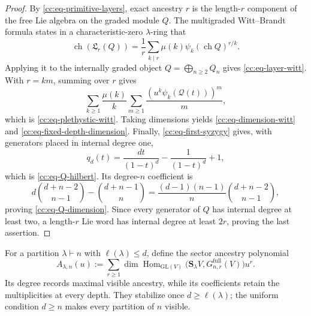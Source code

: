 \documentclass[10pt,reqno]{amsart}
\theoremstyle{plain}
\theoremstyle{definition}
\theoremstyle{remark}
\begin{document}
\begin{proof}
By \eqref{cc:eq-primitive-layers}, exact ancestry \(r\) is the
length-\(r\) component of the free Lie algebra on the graded module \(Q\).
The multigraded Witt--Brandt formula
\cite[\S0.4.2 and \S8.2]{Reutenauer93} states in a characteristic-zero
\(\lambda\)-ring that
\[
 \operatorname{ch}({\mathfrak L}_r(Q))
 =\frac1r\sum_{k\mid r}\mu(k)
   \psi_k(\operatorname{ch}Q)^{r/k}.
\]
Applying it to the internally graded object \(Q=\bigoplus_{n\ge2}Q_n\)
gives \eqref{cc:eq-layer-witt}.  With \(r=km\), summing over \(r\)
gives
\[
 \sum_{k\ge1}\frac{\mu(k)}{k}
 \sum_{m\ge1}\frac{(u^k\psi_k(\mathcal Q(t)))^m}{m},
\]
which is \eqref{cc:eq-plethystic-witt}.  Taking dimensions yields
\eqref{cc:eq-dimension-witt} and
\eqref{cc:eq-fixed-depth-dimension}.  Finally,
\eqref{cc:eq-first-syzygy} gives, with generators placed in internal
degree one,
\[
 q_d(t)=\frac{dt}{(1-t)^d}-\frac1{(1-t)^d}+1,
\]
which is \eqref{cc:eq-Q-hilbert}.  Its degree-\(n\) coefficient is
\[
 d\binom{d+n-2}{n-1}-\binom{d+n-1}{n}
 =\frac{(d-1)(n-1)}{n}\binom{d+n-2}{n-1},
\]
proving \eqref{cc:eq-Q-dimension}.  Since every
generator of \(Q\) has internal degree at least two, a length-\(r\) Lie
word has internal degree at least \(2r\), proving the last assertion.
\end{proof}

For a partition \(\lambda\vdash n\) with \(\ell(\lambda)\leq d\), define
the sector ancestry polynomial
\begin{equation}
 A_{\lambda,n}(u):=
 \sum_{r\geq1}\dim{\operatorname{Hom}}_{\mathrm{GL}(V)}
 \bigl(\mathbf S_\lambda V,G^{\mathrm{full}}_{n,r}(V)\bigr)u^r.
 \label{cc:eq-ancestry-polynomial}
\end{equation}
Its degree records maximal visible ancestry, while its coefficients retain
the multiplicities at every depth.  They stabilize once
\(d\geq\ell(\lambda)\); the uniform condition \(d\geq n\) makes every
partition of \(n\) visible.
\end{document}
